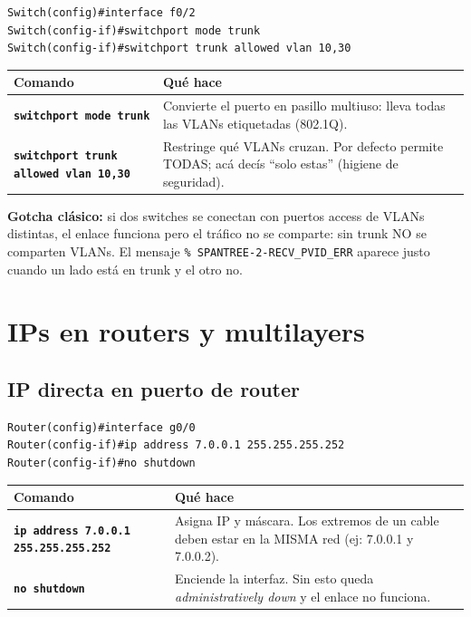 \documentclass[11pt,a4paper]{report}
\newcommand{\cmd}[1]{\texttt{\textbf{#1}}}
\begin{document}
\begin{lstlisting}
Switch(config)#interface f0/2
Switch(config-if)#switchport mode trunk
Switch(config-if)#switchport trunk allowed vlan 10,30
\end{lstlisting}

\begin{longtable}{@{}p{7.5cm}p{8cm}@{}}
\toprule
\textbf{Comando} & \textbf{Qué hace} \\
\midrule
\endhead
\cmd{switchport mode trunk} & Convierte el puerto en pasillo multiuso: lleva todas las VLANs etiquetadas (802.1Q). \\
\addlinespace
\cmd{switchport trunk allowed vlan 10,30} & Restringe qué VLANs cruzan. Por defecto permite TODAS; acá decís ``solo estas'' (higiene de seguridad). \\
\bottomrule
\end{longtable}

\textbf{Gotcha clásico:} si dos switches se conectan con puertos access de VLANs distintas, el enlace funciona pero el tráfico no se comparte: sin trunk NO se comparten VLANs. El mensaje \texttt{\% SPANTREE-2-RECV\_PVID\_ERR} aparece justo cuando un lado está en trunk y el otro no.

\chapter{IPs en routers y multilayers}

\section{IP directa en puerto de router}

\begin{lstlisting}
Router(config)#interface g0/0
Router(config-if)#ip address 7.0.0.1 255.255.255.252
Router(config-if)#no shutdown
\end{lstlisting}

\begin{longtable}{@{}p{6.5cm}p{9cm}@{}}
\toprule
\textbf{Comando} & \textbf{Qué hace} \\
\midrule
\endhead
\cmd{ip address 7.0.0.1 255.255.255.252} & Asigna IP y máscara. Los extremos de un cable deben estar en la MISMA red (ej: 7.0.0.1 y 7.0.0.2). \\
\addlinespace
\cmd{no shutdown} & Enciende la interfaz. Sin esto queda \emph{administratively down} y el enlace no funciona. \\
\bottomrule
\end{longtable}
\end{document}
